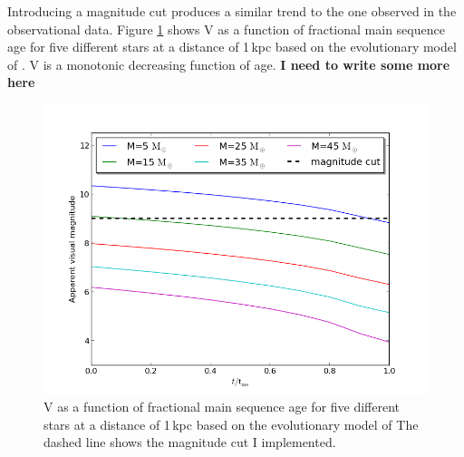 \documentclass[a4paper,10pt]{article}
\begin{document}
 Introducing a magnitude cut produces a similar trend to the one observed in the observational data. Figure \ref{magage} shows
 V as a function of fractional main sequence age for five different stars at a distance of 1$\,$kpc based on the evolutionary model of 
 \citet{2000MNRAS.315..543H}. V is a monotonic decreasing function of age.  \textbf{I need to write some more here}\\
 \begin{figure}
  \includegraphics[width=\textwidth]{magage}
  \caption{V as a function of fractional main sequence age for five different stars at a distance of 1$\,$kpc based on the evolutionary model 
  of \citet{2000MNRAS.315..543H} The dashed line shows the magnitude cut I implemented.\label{magage}}
 \end{figure}
\end{document}
